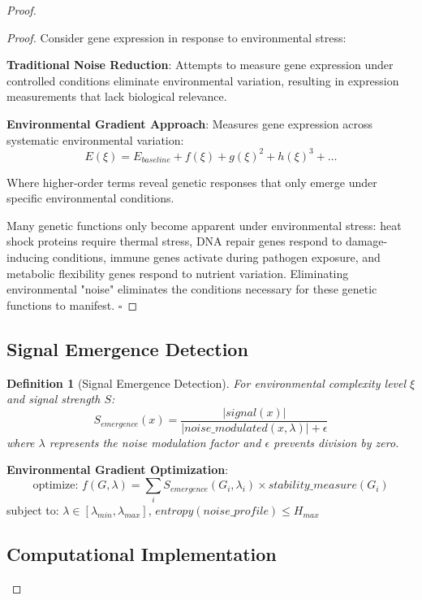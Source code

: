 \documentclass[12pt,a4paper]{article}
\newtheorem{definition}[theorem]{Definition}
\begin{document}
\begin{proof}
\begin{proof}
Consider gene expression in response to environmental stress:

\textbf{Traditional Noise Reduction}: Attempts to measure gene expression under controlled conditions eliminate environmental variation, resulting in expression measurements that lack biological relevance.

\textbf{Environmental Gradient Approach}: Measures gene expression across systematic environmental variation:
\begin{equation}
E(\xi) = E_{baseline} + f(\xi) + g(\xi)^2 + h(\xi)^3 + \ldots
\end{equation}

Where higher-order terms reveal genetic responses that only emerge under specific environmental conditions.

Many genetic functions only become apparent under environmental stress: heat shock proteins require thermal stress, DNA repair genes respond to damage-inducing conditions, immune genes activate during pathogen exposure, and metabolic flexibility genes respond to nutrient variation. Eliminating environmental "noise" eliminates the conditions necessary for these genetic functions to manifest. $\square$
\end{proof}

\subsection{Signal Emergence Detection}

\begin{definition}[Signal Emergence Detection]
For environmental complexity level $\xi$ and signal strength $S$:
\begin{equation}
S_{emergence}(x) = \frac{|signal(x)|}{|noise\_modulated(x, \lambda)| + \epsilon}
\end{equation}
where $\lambda$ represents the noise modulation factor and $\epsilon$ prevents division by zero.
\end{definition}

\textbf{Environmental Gradient Optimization}:
\begin{equation}
\text{optimize: } f(G, \lambda) = \sum_i S_{emergence}(G_i, \lambda_i) \times stability\_measure(G_i)
\end{equation}
subject to: $\lambda \in [\lambda_{min}, \lambda_{max}]$, $entropy(noise\_profile) \leq H_{max}$

\subsection{Computational Implementation}


\end{proof}
\end{document}
